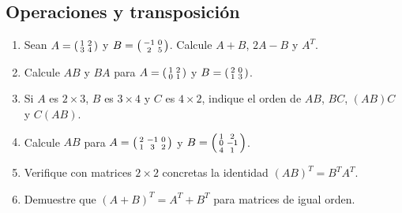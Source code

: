 \documentclass[12pt]{article}
\theoremstyle{remark}
\newcounter{contadorEjercicio}
\newenvironment{listaejercicios}{\begin{enumerate}[label=\textbf{E\arabic*.},leftmargin=2.4em,itemsep=0.52em]\setcounter{enumi}{\value{contadorEjercicio}}}{\setcounter{contadorEjercicio}{\value{enumi}}\end{enumerate}}
\begin{document}
\subsection{Operaciones y transposición}
\begin{listaejercicios}
\item Sean $A=\begin{psmallmatrix}1&2\\3&4\end{psmallmatrix}$ y $B=\begin{psmallmatrix}-1&0\\2&5\end{psmallmatrix}$. Calcule $A+B$, $2A-B$ y $A^T$.
\item Calcule $AB$ y $BA$ para $A=\begin{psmallmatrix}1&2\\0&1\end{psmallmatrix}$ y $B=\begin{psmallmatrix}2&0\\1&3\end{psmallmatrix}$.
\item Si $A$ es $2\times3$, $B$ es $3\times4$ y $C$ es $4\times2$, indique el orden de $AB$, $BC$, $(AB)C$ y $C(AB)$.
\item Calcule $AB$ para $A=\begin{psmallmatrix}2&-1&0\\1&3&2\end{psmallmatrix}$ y $B=\begin{psmallmatrix}1&2\\0&-1\\4&1\end{psmallmatrix}$.
\item Verifique con matrices $2\times2$ concretas la identidad $(AB)^T=B^TA^T$.
\item Demuestre que $(A+B)^T=A^T+B^T$ para matrices de igual orden.
\end{listaejercicios}
\end{document}
